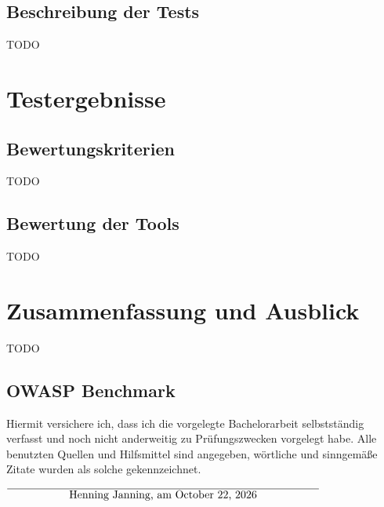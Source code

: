 \documentclass[12pt,oneside,a4paper,parskip]{scrbook}
\def\BaAuthor{Henning Janning}
\begin{document}
\section{Beschreibung der Tests}
TODO

\chapter{Testergebnisse}
\section{Bewertungskriterien}
TODO
\section{Bewertung der Tools}
TODO

\chapter{Zusammenfassung und Ausblick}
TODO
\section{OWASP Benchmark}



\backmatter

\listoffigures
{}

\listoftables


\cleardoublepage
{}
{}
\printbibliography



Hiermit versichere ich, dass ich die vorgelegte Bachelorarbeit selbstständig verfasst und noch nicht anderweitig zu Prüfungszwecken vorgelegt habe. Alle benutzten Quellen und Hilfsmittel sind angegeben, wörtliche und sinngemäße Zitate wurden als solche gekennzeichnet.

\vspace{20pt}
\begin{flushright}
$\overline{~~~~~~~~~~~~~~~~~\mbox{\BaAuthor, am \today}~~~~~~~~~~~~~~~~~}$
\end{flushright}
\end{document}
